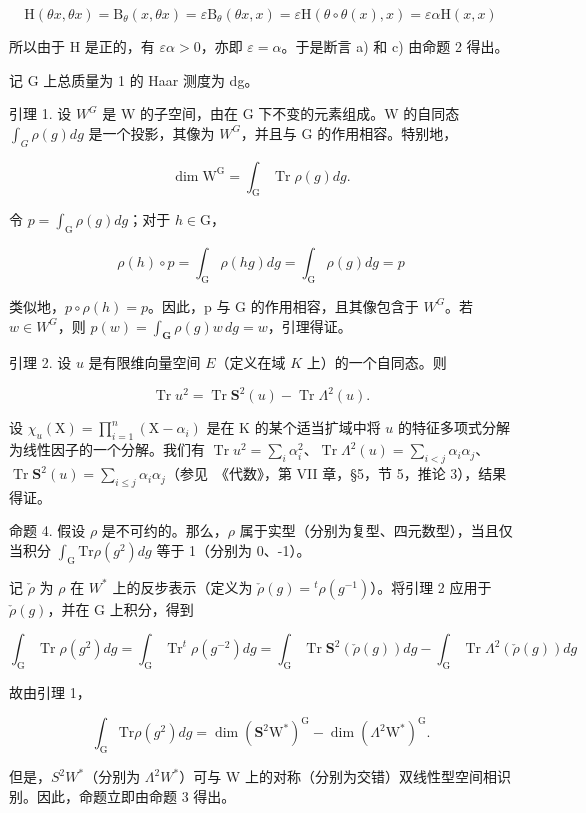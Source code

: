 \[
\mathrm{H} (\theta x, \theta x) = \mathrm{B} _ {\theta} (x, \theta x) = \varepsilon \mathrm{B} _ {\theta} (\theta x, x) = \varepsilon \mathrm{H} (\theta \circ \theta (x), x) = \varepsilon \alpha \mathrm{H} (x, x)
\]

所以由于 H 是正的，有 \(\varepsilon\alpha > 0\)，亦即 \(\varepsilon = \alpha\)。于是断言 a) 和 c) 由命题 2 得出。

记 G 上总质量为 1 的 Haar 测度为 dg。

引理 1. 设 \(W^{G}\) 是 W 的子空间，由在 G 下不变的元素组成。W 的自同态 \(\int_{G}\rho(g)dg\) 是一个投影，其像为 \(W^{G}\)，并且与 G 的作用相容。特别地，

\[
\dim \mathrm{W} ^ {\mathrm{G}} = \int_ {\mathrm{G}} \operatorname{Tr} \rho (g) d g.
\]

令 \(p = \int_{\mathrm{G}} \rho(g) dg\)；对于 \(h \in \mathrm{G}\)，

\[
\rho (h) \circ p = \int_ {\mathrm{G}} \rho (h g) d g = \int_ {\mathrm{G}} \rho (g) d g = p
\]

类似地，\(p \circ \rho(h) = p\)。因此，p 与 G 的作用相容，且其像包含于 \(W^{G}\)。若 \(w \in W^{G}\)，则 \(p(w) = \int_{\mathbf{G}} \rho(g) w \, dg = w\)，引理得证。

引理 2. 设 \(u\) 是有限维向量空间 \(E\)（定义在域 \(K\) 上）的一个自同态。则

\[
\operatorname{Tr} u ^ {2} = \operatorname{Tr} \mathbf {S} ^ {2} (u) - \operatorname{Tr} \Lambda^ {2} (u).
\]

设 \(\chi_u(\mathrm{X}) = \prod_{i=1}^{n} (\mathrm{X} - \alpha_i)\) 是在 K 的某个适当扩域中将 \(u\) 的特征多项式分解为线性因子的一个分解。我们有 \(\operatorname{Tr} u^2 = \sum_i \alpha_i^2\)、\(\operatorname{Tr} \Lambda^2(u) = \sum_{i < j} \alpha_i \alpha_j\)、\(\operatorname{Tr} \mathbf{S}^2(u) = \sum_{i \leq j} \alpha_i \alpha_j\)（参见~《代数》，第 VII 章，§5，节 5，推论 3），结果得证。

命题 4. 假设 \(\rho\) 是不可约的。那么，\(\rho\) 属于实型（分别为复型、四元数型），当且仅当积分 \(\int_{\mathrm{G}} \mathrm{Tr} \rho(g^2) dg\) 等于 1（分别为 0、-1）。

记 \(\check{\rho}\) 为 \(\rho\) 在 \(W^{*}\) 上的反步表示（定义为 \(\check{\rho}(g)={}^{t}\rho(g^{-1})\)）。将引理 2 应用于 \(\check{\rho}(g)\)，并在 G 上积分，得到

\[
\int_ {\mathrm{G}} \operatorname{Tr} \rho (g ^ {2}) d g = \int_ {\mathrm{G}} \operatorname{Tr} ^ {t} \rho (g ^ {- 2}) d g = \int_ {\mathrm{G}} \operatorname{Tr} \mathbf {S} ^ {2} (\check {\rho} (g)) d g - \int_ {\mathrm{G}} \operatorname{Tr} \Lambda^ {2} (\check {\rho} (g)) d g
\]

故由引理 1，

\[
\int_ {\mathrm{G}} \mathrm{Tr} \rho (g ^ {2}) d g = \dim (\mathbf {S} ^ {2} \mathrm{W} ^ {*}) ^ {\mathrm{G}} - \dim (\Lambda^ {2} \mathrm{W} ^ {*}) ^ {\mathrm{G}}.
\]

但是，\(S^{2}W^{*}\)（分别为 \(\Lambda^{2}W^{*}\)）可与 W 上的对称（分别为交错）双线性型空间相识别。因此，命题立即由命题 3 得出。

